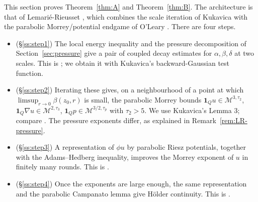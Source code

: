 \documentclass[11pt,reqno]{amsart}
\begin{document}
This section proves Theorem~\ref{thm:A} and Theorem~\ref{thm:B}. The
architecture is that of Lemarié-Rieusset \cite[\S13.8--13.9]{LemarieRieusset2016},
which combines the scale iteration of Kukavica \cite{Kukavica2008} with the
parabolic Morrey/potential endgame of O'Leary \cite{OLeary2003}. There are four
steps.
\begin{itemize}
\item[\textbf{Step 1}] (\S\ref{ss:step1}) The local energy inequality and the
  pressure decomposition of Section~\ref{sec:pressure} give a pair of coupled
  decay estimates for $\alpha,\beta,\delta$ at two scales. This is
  \cite[Lemma 13.3, (13.30)--(13.31), pp.~430--434]{LemarieRieusset2016}; we
  obtain it with Kukavica's backward-Gaussian test function.
\item[\textbf{Step 2}] (\S\ref{ss:step2}) Iterating these gives, on a
  neighbourhood of a point at which $\limsup_{r\to0}\beta(z_{0},r)$ is small,
  the parabolic Morrey bounds
  $\mathbf{1}_{Q}u\in\mathcal{M}^{3,\tau_{2}}$,
  $\mathbf{1}_{Q}\nabla u\in\mathcal{M}^{2,\tau_{3}}$,
  $\mathbf{1}_{Q}p\in\mathcal{M}^{3/2,\tau_{p}}$ with $\tau_{2}>5$. We use
  Kukavica's Lemma 3; compare
  \cite[Lemma 13.4, pp.~435--439]{LemarieRieusset2016}.
  The pressure exponents differ, as explained in Remark~\ref{rem:LR-pressure}.
\item[\textbf{Step 3}] (\S\ref{ss:step3}) A representation of $\phi u$ by
  parabolic Riesz potentials, together with the Adams--Hedberg inequality,
  improves the Morrey exponent of $u$ in finitely many rounds. This is
  \cite[Lemma 13.5, pp.~439--441]{LemarieRieusset2016}.
\item[\textbf{Step 4}] (\S\ref{ss:step4}) Once the exponents are large enough,
  the same representation and the parabolic Campanato lemma give H\"older
  continuity. This is
  \cite[Lemma 13.6 and Proposition 13.4]{LemarieRieusset2016}.
\end{itemize}
\end{document}

